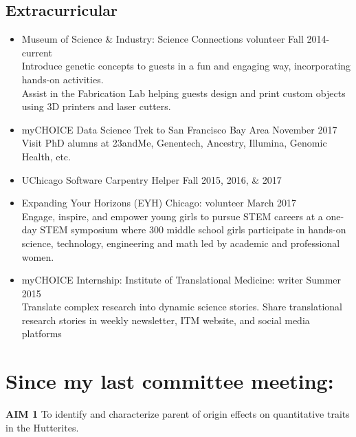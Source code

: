 \documentclass[a4paper, 11pt]{article}
\begin{document}
\subsection*{Extracurricular}
\begin{itemize}
	\item Museum of Science \& Industry: Science Connections volunteer \hfill Fall 2014-current \\
		Introduce genetic concepts to guests in a fun and engaging way, incorporating hands-on activities.\\Assist in the Fabrication Lab helping guests design and print custom objects using 3D printers and laser cutters.

	\item myCHOICE Data Science Trek to San Francisco Bay Area \hfill November 2017 \\
		Visit PhD alumns at 23andMe, Genentech, Ancestry, Illumina, Genomic Health, etc.
		\item UChicago Software Carpentry Helper \hfill Fall 2015, 2016, \& 2017
	\item Expanding Your Horizons (EYH) Chicago: volunteer \hfill March 2017 \\
	Engage, inspire, and empower young girls to pursue STEM careers at a one-day STEM symposium where 300 middle school girls participate in hands-on science, technology, engineering and math led by academic and professional women.
   	\item myCHOICE Internship: Institute of Translational Medicine: writer \hfill Summer 2015\\Translate complex research into dynamic science stories. Share translational research stories in weekly newsletter, ITM website, and social media platforms

\end{itemize}




\newpage

\section*{Since my last committee meeting:} %
\textbf{AIM 1} To identify and characterize parent of origin effects on quantitative traits in the Hutterites. \\
\end{document}
